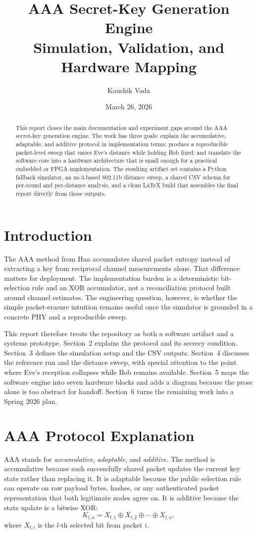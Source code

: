 \documentclass[11pt]{article}
\title{\textbf{AAA Secret-Key Generation Engine}\\Simulation, Validation, and Hardware Mapping}
\author{Kaushik Vada}
\date{March 26, 2026}
\begin{document}
\maketitle

\begin{abstract}
This report closes the main documentation and experiment gaps around the AAA secret-key generation engine. The work has three goals: explain the accumulative, adaptable, and additive protocol in implementation terms; produce a reproducible packet-level sweep that varies Eve's distance while holding Bob fixed; and translate the software core into a hardware architecture that is small enough for a practical embedded or FPGA implementation. The resulting artifact set contains a Python fallback simulator, an ns-3-based 802.11b distance sweep, a shared CSV schema for per-round and per-distance analysis, and a clean LaTeX build that assembles the final report directly from those outputs.
\end{abstract}

\section{Introduction}
The AAA method from Hua accumulates shared packet entropy instead of extracting a key from reciprocal channel measurements alone. That difference matters for deployment. The implementation burden is a deterministic bit-selection rule and an XOR accumulator, not a reconciliation protocol built around channel estimates. The engineering question, however, is whether the simple packet-erasure intuition remains useful once the simulator is grounded in a concrete PHY and a reproducible sweep.

This report therefore treats the repository as both a software artifact and a systems prototype. Section~2 explains the protocol and its secrecy condition. Section~3 defines the simulation setup and the CSV outputs. Section~4 discusses the reference run and the distance sweep, with special attention to the point where Eve's reception collapses while Bob remains available. Section~5 maps the software engine into seven hardware blocks and adds a diagram because the prose alone is too abstract for handoff. Section~6 turns the remaining work into a Spring 2026 plan.

\section{AAA Protocol Explanation}
AAA stands for \emph{accumulative}, \emph{adaptable}, and \emph{additive}. The method is accumulative because each successfully shared packet updates the current key state rather than replacing it. It is adaptable because the public selection rule can operate on raw payload bytes, hashes, or any authenticated packet representation that both legitimate nodes agree on. It is additive because the state update is a bitwise XOR:
\[
K_{l,n} = X_{l,1} \oplus X_{l,2} \oplus \cdots \oplus X_{l,n},
\]
where \(X_{l,i}\) is the \(l\)-th selected bit from packet \(i\).
\end{document}
